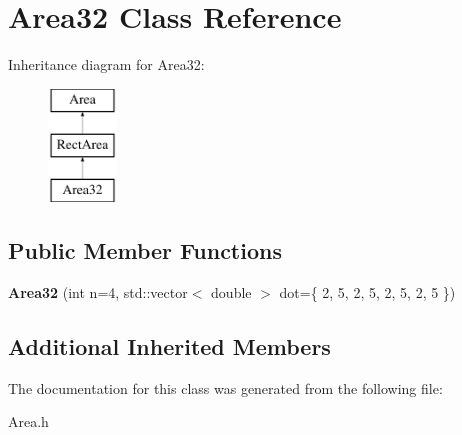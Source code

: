 \hypertarget{class_area32}{}\section{Area32 Class Reference}
\label{class_area32}
Inheritance diagram for Area32\+:\begin{figure}[H]
\begin{center}
\leavevmode
\includegraphics[height=3.000000cm]{class_area32}
\end{center}
\end{figure}
\subsection*{Public Member Functions}
\begin{DoxyCompactItemize}
\item 
\mbox{\label{class_area32_a8d99e0e27d2f86097a5ff4ea03e9503d}} 
{\bfseries Area32} (int n=4, std\+::vector$<$ double $>$ dot=\{ 2, 5, 2, 5, 2, 5, 2, 5 \})
\end{DoxyCompactItemize}
\subsection*{Additional Inherited Members}


The documentation for this class was generated from the following file\+:\begin{DoxyCompactItemize}
\item 
Area.\+h\end{DoxyCompactItemize}
